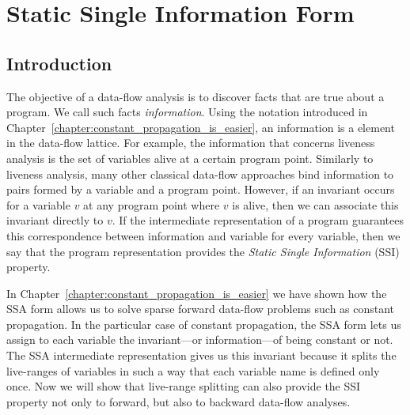 \chapter{Static Single Information Form }
\label{chapter:ssi}

{
\def\progpoint{program point\xspace}
\def\progpoints{program points\xspace}
\def\splitpoint{control-flow point\xspace}
\def\splitpoints{control-flow points\xspace}
\def\psplit{\emph{Split}\xspace}
\def\pinfo{\emph{Info}\xspace}
\def\plink{\emph{Link}\xspace}
\def\pversion{\emph{Version}\xspace}


\section{Introduction}
\label{sec:ssi:pereira:intro}

The objective of a data-flow analysis is to discover facts that are true about a
program.
We call such facts {\em information}.
Using the notation introduced in 
Chapter~\ref{chapter:constant_propagation_is_easier}, an
information is a element in the data-flow lattice.
For example, the information that concerns liveness analysis is the set of
variables alive at a certain \progpoint.
Similarly to liveness analysis, many other classical data-flow approaches bind
information to pairs formed by a variable and a \progpoint.
However, if an invariant occurs for a variable $v$ at any \progpoint where
$v$ is alive, then we can associate this invariant directly to $v$.
If the intermediate representation of a program guarantees this correspondence 
between
information and variable for every variable, then we say that the program
representation provides the {\em Static Single Information} (SSI) property.

In Chapter~\ref{chapter:constant_propagation_is_easier} we have shown how the 
SSA form allows us to solve sparse forward data-flow problems such as constant 
propagation.
In the particular case of constant propagation, the SSA form lets us assign to 
each variable the invariant---or information---of being constant or not.
The SSA intermediate representation gives us this invariant because it splits 
the live-ranges of variables in such a way that each variable name is defined 
only once.
Now we will show that live-range splitting can also provide the SSI property not only to forward, but also to backward data-flow analyses.

}

